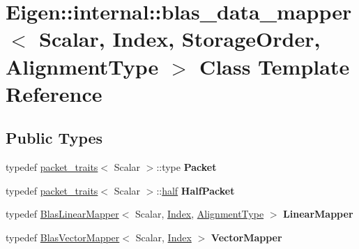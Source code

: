 \hypertarget{class_eigen_1_1internal_1_1blas__data__mapper}{}\section{Eigen\+:\+:internal\+:\+:blas\+\_\+data\+\_\+mapper$<$ Scalar, Index, Storage\+Order, Alignment\+Type $>$ Class Template Reference}
\label{class_eigen_1_1internal_1_1blas__data__mapper}
\subsection*{Public Types}
\begin{DoxyCompactItemize}
\item 
\mbox{\label{class_eigen_1_1internal_1_1blas__data__mapper_a6b3a9094d6d25aaecebb80ea9d0cd802}} 
typedef \hyperlink{struct_eigen_1_1internal_1_1packet__traits}{packet\+\_\+traits}$<$ Scalar $>$\+::type {\bfseries Packet}
\item 
\mbox{\label{class_eigen_1_1internal_1_1blas__data__mapper_a2a7e2cc9f49b1328b3c730a4ea94dda0}} 
typedef \hyperlink{struct_eigen_1_1internal_1_1packet__traits}{packet\+\_\+traits}$<$ Scalar $>$\+::\hyperlink{struct_eigen_1_1half}{half} {\bfseries Half\+Packet}
\item 
\mbox{\label{class_eigen_1_1internal_1_1blas__data__mapper_a6ece4295a96eb25888a84b66d74ecea1}} 
typedef \hyperlink{class_eigen_1_1internal_1_1_blas_linear_mapper}{Blas\+Linear\+Mapper}$<$ Scalar, \hyperlink{namespace_eigen_a62e77e0933482dafde8fe197d9a2cfde}{Index}, \hyperlink{group__enums_ga45fe06e29902b7a2773de05ba27b47a1}{Alignment\+Type} $>$ {\bfseries Linear\+Mapper}
\item 
\mbox{\label{class_eigen_1_1internal_1_1blas__data__mapper_a6af2e5b42bf8920514caed0900e136ea}} 
typedef \hyperlink{class_eigen_1_1internal_1_1_blas_vector_mapper}{Blas\+Vector\+Mapper}$<$ Scalar, \hyperlink{namespace_eigen_a62e77e0933482dafde8fe197d9a2cfde}{Index} $>$ {\bfseries Vector\+Mapper}
\item 

\end{DoxyCompactItemize}
